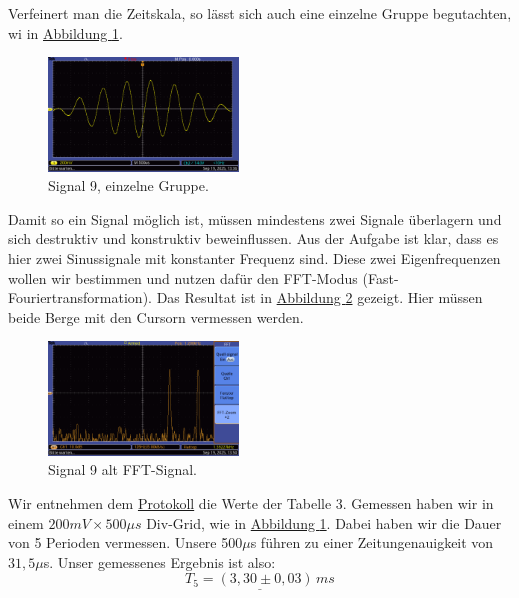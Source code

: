 Verfeinert man die Zeitskala, so lässt sich auch eine einzelne Gruppe begutachten, wi in \hyperref[fig:s9_einzeln]{Abbildung \ref*{fig:s9_einzeln}}.

\begin{figure} [h!]
    \centering
        \includegraphics[width=0.45\textwidth]{img/25/Signale2/Signal9-einzeln.pdf}
    \caption{Signal 9, einzelne Gruppe.}
    \label{fig:s9_einzeln}
\end{figure}

Damit so ein Signal möglich ist, müssen mindestens zwei Signale überlagern und sich destruktiv und konstruktiv beweinflussen. Aus der Aufgabe ist klar, dass es hier zwei Sinussignale mit konstanter Frequenz sind. Diese zwei Eigenfrequenzen wollen wir bestimmen und nutzen dafür den FFT-Modus (Fast-Fouriertransformation).
Das Resultat ist in \hyperref[fig:s9_fft]{Abbildung \ref*{fig:s9_fft}} gezeigt. 
Hier müssen beide Berge mit den Cursorn vermessen werden.

\begin{figure} [h!]
    \centering
        \includegraphics[width=0.45\textwidth]{img/25/Signale2/Sig9-FFT.pdf}
    \caption{Signal 9 alt FFT-Signal.}
    \label{fig:s9_fft}
\end{figure}

Wir entnehmen dem \hyperref[Protokoll]{Protokoll} die Werte der Tabelle 3. Gemessen haben wir in einem $200mV \times 500 \mu s$ Div-Grid, wie in \hyperref[fig:s9_einzeln]{Abbildung \ref*{fig:s9_einzeln}}.
Dabei haben wir die Dauer von 5 Perioden vermessen. Unsere 500$\mu$s führen zu einer Zeitungenauigkeit von $31,5 \mu$s. Unser gemessenes Ergebnis ist also:
\begin{equation}
\underline{
    T_5 = (3,30 \pm 0,03) \, ms
}
\end{equation}

